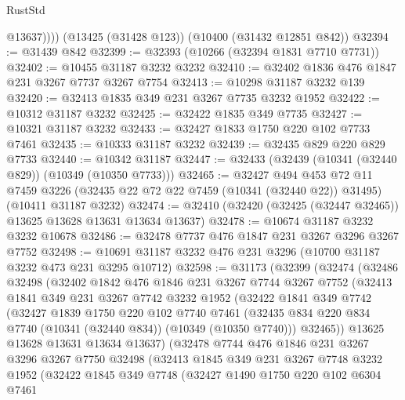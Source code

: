 \begin{lexlean}{RustStd}
\begin{coremodule}
            @13637))))
    (@13425 (@31428 @123))
    (@10400 (@31432 @12851 @842))
@32394 := @31439 @842
@32399 := @32393 (@10266 (@32394 @1831 @7710 @7731))
@32402 := @10455 @31187 @3232 @3232
@32410 := @32402 @1836 @476 @1847 @231 @3267 @7737 @3267 @7754
@32413 := @10298 @31187 @3232 @139
@32420 := @32413 @1835 @349 @231 @3267 @7735 @3232 @1952
@32422 := @10312 @31187 @3232
@32425 := @32422 @1835 @349 @7735
@32427 := @10321 @31187 @3232
@32433 := @32427 @1833 @1750 @220 @102 @7733 @7461
@32435 := @10333 @31187 @3232
@32439 := @32435 @829 @220 @829 @7733
@32440 := @10342 @31187
@32447 := @32433 (@32439 (@10341 (@32440 @829)) (@10349 (@10350 @7733)))
@32465 := @32427
    @494
    @453
    @72
    @11
    @7459
    @3226
    (@32435 @22 @72 @22 @7459 (@10341 (@32440 @22)) @31495)
    (@10411 @31187 @3232)
@32474 := @32410 (@32420 (@32425 (@32447 @32465)) @13625 @13628 @13631 @13634 @13637)
@32478 := @10674 @31187 @3232 @3232 @10678
@32486 := @32478 @7737 @476 @1847 @231 @3267 @3296 @3267 @7752
@32498 := @10691 @31187 @3232 @476 @231 @3296 (@10700 @31187 @3232 @473 @231 @3295 @10712)
@32598 := @31173
    (@32399
      (@32474
        (@32486
          @32498
          (@32402
            @1842
            @476
            @1846
            @231
            @3267
            @7744
            @3267
            @7752
            (@32413
              @1841
              @349
              @231
              @3267
              @7742
              @3232
              @1952
              (@32422
                @1841
                @349
                @7742
                (@32427
                  @1839
                  @1750
                  @220
                  @102
                  @7740
                  @7461
                  (@32435 @834 @220 @834 @7740 (@10341 (@32440 @834)) (@10349 (@10350 @7740)))
                  @32465))
              @13625
              @13628
              @13631
              @13634
              @13637)
            (@32478
              @7744
              @476
              @1846
              @231
              @3267
              @3296
              @3267
              @7750
              @32498
              (@32413
                @1845
                @349
                @231
                @3267
                @7748
                @3232
                @1952
                (@32422
                  @1845
                  @349
                  @7748
                  (@32427
                    @1490
                    @1750
                    @220
                    @102
                    @6304
                    @7461

\end{coremodule}
\end{lexlean}
